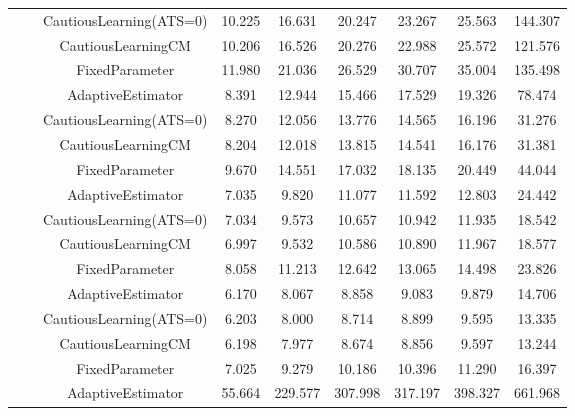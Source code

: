 \begin{table}[!h]
\begin{tabular}[t]{ccccccccc}
 &  & CautiousLearning(ATS=0) & 10.225 & 16.631 & 20.247 & 23.267 & 25.563 & 144.307\\

 &  & CautiousLearningCM & 10.206 & 16.526 & 20.276 & 22.988 & 25.572 & 121.576\\

 & \multirow[t]{-4}{*}{\centering\arraybackslash 0.75} & FixedParameter & 11.980 & 21.036 & 26.529 & 30.707 & 35.004 & 135.498\\
\cmidrule{2-9}
 &  & AdaptiveEstimator & 8.391 & 12.944 & 15.466 & 17.529 & 19.326 & 78.474\\

 &  & CautiousLearning(ATS=0) & 8.270 & 12.056 & 13.776 & 14.565 & 16.196 & 31.276\\

 &  & CautiousLearningCM & 8.204 & 12.018 & 13.815 & 14.541 & 16.176 & 31.381\\

 & \multirow[t]{-4}{*}{\centering\arraybackslash 1.00} & FixedParameter & 9.670 & 14.551 & 17.032 & 18.135 & 20.449 & 44.044\\
\cmidrule{2-9}
 &  & AdaptiveEstimator & 7.035 & 9.820 & 11.077 & 11.592 & 12.803 & 24.442\\

 &  & CautiousLearning(ATS=0) & 7.034 & 9.573 & 10.657 & 10.942 & 11.935 & 18.542\\

 &  & CautiousLearningCM & 6.997 & 9.532 & 10.586 & 10.890 & 11.967 & 18.577\\

 & \multirow[t]{-4}{*}{\centering\arraybackslash 1.25} & FixedParameter & 8.058 & 11.213 & 12.642 & 13.065 & 14.498 & 23.826\\
\cmidrule{2-9}
 &  & AdaptiveEstimator & 6.170 & 8.067 & 8.858 & 9.083 & 9.879 & 14.706\\

 &  & CautiousLearning(ATS=0) & 6.203 & 8.000 & 8.714 & 8.899 & 9.595 & 13.335\\

 &  & CautiousLearningCM & 6.198 & 7.977 & 8.674 & 8.856 & 9.597 & 13.244\\

\multirow[t]{-28}{*}{\centering\arraybackslash 1} & \multirow[t]{-4}{*}{\centering\arraybackslash 1.50} & FixedParameter & 7.025 & 9.279 & 10.186 & 10.396 & 11.290 & 16.397\\
\cmidrule{1-9}
 &  & AdaptiveEstimator & 55.664 & 229.577 & 307.998 & 317.197 & 398.327 & 661.968\\


\end{tabular}
\end{table}
